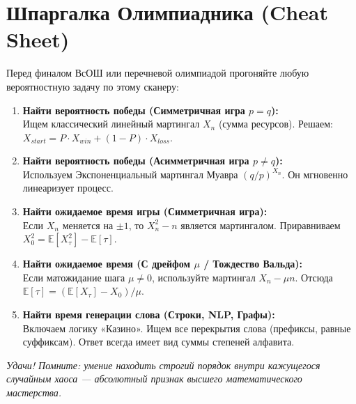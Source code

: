 \documentclass[12pt,a4paper]{article}
\newcommand{\E}{\mathbb{E}}
\begin{document}
\newpage

\section{Шпаргалка Олимпиадника (Cheat Sheet)}

Перед финалом ВсОШ или перечневой олимпиадой прогоняйте любую вероятностную задачу по этому сканеру:

\begin{tcolorbox}[colback=yellow!5, colframe=orange!80!black, title=\textbf{Как выбрать правильный мартингал?}, fonttitle=\bfseries]
\begin{enumerate}
    \item \textbf{Найти вероятность победы (Симметричная игра $p=q$):}\\
    Ищем классический линейный мартингал $X_n$ (сумма ресурсов). Решаем: $X_{start} = P \cdot X_{win} + (1-P) \cdot X_{loss}$.
    
    \item \textbf{Найти вероятность победы (Асимметричная игра $p \neq q$):}\\
    Используем Экспоненциальный мартингал Муавра $(q/p)^{X_n}$. Он мгновенно линеаризует процесс.
    
    \item \textbf{Найти ожидаемое время игры (Симметричная игра):}\\
    Если $X_n$ меняется на $\pm 1$, то $X_n^2 - n$ является мартингалом. Приравниваем $X_0^2 = \E[X_\tau^2] - \E[\tau]$. 
    
    \item \textbf{Найти ожидаемое время (С дрейфом $\mu$ / Тождество Вальда):}\\
    Если матожидание шага $\mu \neq 0$, используйте мартингал $X_n - \mu n$. 
    Отсюда $\E[\tau] = (\E[X_\tau] - X_0) / \mu$.
    
    \item \textbf{Найти время генерации слова (Строки, NLP, Графы):}\\
    Включаем логику «Казино». Ищем все перекрытия слова (префиксы, равные суффиксам). Ответ всегда имеет вид суммы степеней алфавита.
\end{enumerate}
\end{tcolorbox}

\vspace{0.8cm}
\begin{center}
\textit{Удачи! Помните: умение находить строгий порядок внутри кажущегося случайным хаоса --- абсолютный признак высшего математического мастерства.}
\end{center}
\end{document}
